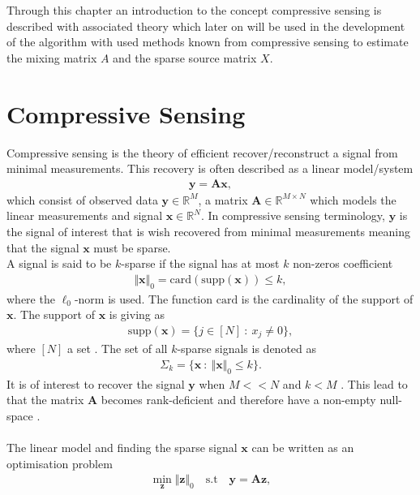 Through this chapter an introduction to the concept compressive sensing is described with associated theory which later on will be used in the development of the algorithm with used methods known from compressive sensing to estimate the mixing matrix $A$ and the sparse source matrix $X$.

\section{Compressive Sensing}
Compressive sensing is the theory of efficient recover/reconstruct a signal from minimal measurements. This recovery is often described as a linear model/system 
\begin{align*}
\mathbf{y} = \mathbf{Ax},
\end{align*}
which consist of observed data $\mathbf{y} \in \mathbb{R}^M$, a matrix $\mathbf{A} \in \mathbb{R}^{M \times N}$ which models the linear measurements and signal $\mathbf{x} \in \mathbb{R}^N$. In compressive sensing terminology, $\mathbf{y}$ is the signal of interest that is wish recovered from minimal measurements meaning that the signal $\mathbf{x}$ must be sparse.
\\
A signal is said to be $k$-sparse if the signal has at most $k$ non-zeros coefficient
\begin{align*}
\Vert \mathbf{x} \Vert_0 = \text{card}(\text{supp}(\mathbf{x})) \leq k,
\end{align*}
where the $\ell_0$-norm is used. The function $\text{card}$ is the cardinality of the support of $\mathbf{x}$. The support of $\mathbf{x}$ is giving as
\begin{align*}
\text{supp}(\mathbf{x}) = \{ j \in [N] \ : \ x_j \neq 0 \},
\end{align*} 
where $[N]$ a set \cite[p. 41]{FR}. The set of all $k$-sparse signals is denoted as
\begin{align*}
\Sigma_k = \{ \mathbf{x} \ : \ \Vert \mathbf{x} \Vert_0 \leq k \}.
\end{align*}
It is of interest to recover the signal $\mathbf{y}$ when $M << N$ and $k < M$ \cite[p. 8]{CS}. This lead to that the matrix $\mathbf{A}$ becomes rank-deficient and therefore have a non-empty null-space \cite[p. ix]{CS}.
\\ \\
The linear model and finding the sparse signal $\mathbf{x}$ can be written as an optimisation problem
\begin{align*}
\min_{\mathbf{z}} \Vert \mathbf{z} \Vert_0 \quad \text{s.t} \quad \mathbf{y} = \mathbf{Az},
\end{align*}
